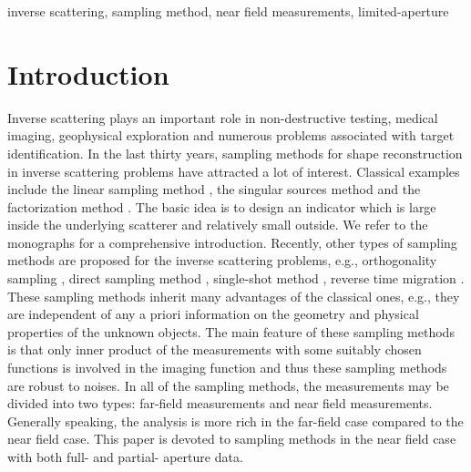 \documentclass[final]{siamltex}
\begin{document}
\begin{keywords}
 inverse scattering,  sampling method, near field measurements, limited-aperture
 \end{keywords}
\section{Introduction}  \label{Introduction}
Inverse scattering  plays an important role in non-destructive testing, medical imaging, geophysical exploration and numerous problems associated with target identification. In the last thirty years, sampling methods for shape reconstruction in inverse scattering problems have attracted a lot of interest.
Classical examples include the linear sampling method  \cite{ColtonKirsch}, the singular sources method  \cite{potthast2010study}
and the factorization method  \cite{Kirsch98}.
The basic idea is to design an indicator which is large inside the underlying scatterer and relatively small outside.
We refer to the monographs  \cite{CaCo,CK,kirsch2008factorization} for a comprehensive introduction.
Recently, other types of sampling methods are proposed for the inverse scattering problems,
e.g., orthogonality sampling   \cite{potthast2010study,griesmaier2011multi,harris2020orthogonality}, direct sampling method  \cite{ItoJinZou,LiuIP17}, single-shot method   \cite{LiLiuZou},
reverse time migration \cite{CCH2013}.
These sampling methods inherit many advantages of the classical ones, e.g., they are independent of any a priori information on the geometry and physical properties of the unknown objects. The main feature of these  sampling methods is that only inner product of the measurements with some suitably chosen functions is involved in the imaging function and thus  these  sampling methods are robust to noises.
In all of the sampling methods, the measurements may be divided into two types: far-field measurements and near field measurements. Generally speaking, the analysis is more rich in the far-field case compared to the near field case. This paper is devoted to  sampling methods in the near field case with both full- and partial- aperture data.
\end{document}
